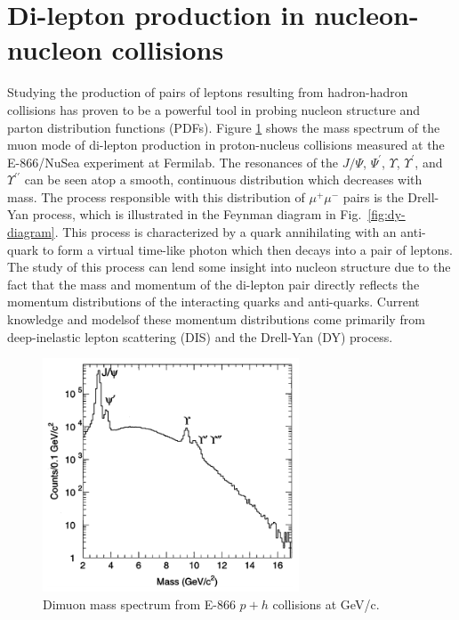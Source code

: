 \section{Di-lepton production in nucleon-nucleon collisions}

Studying the production of pairs of leptons resulting from hadron-hadron collisions has proven to be a powerful tool in probing nucleon structure and parton distribution functions (PDFs). Figure \ref{fig:DY-spectrum} shows the mass spectrum of the muon mode of di-lepton production in proton-nucleus collisions measured at the E-866/NuSea experiment at Fermilab\cite{PhysRevLett.80.3715}. The resonances of the $J/\Psi$, $\Psi^\prime$, $\Upsilon$, $\Upsilon^\prime$, and $\Upsilon^{\prime\prime}$ can be seen atop a smooth, continuous distribution which decreases with mass. The process responsible with this distribution of $\mu^+\mu^-$ pairs is the Drell-Yan process\cite{PhysRevLett.25.316}, which is illustrated in the Feynman diagram in Fig.~\ref{fig:dy-diagram}. This process is characterized by a quark annihilating with an anti-quark to form a virtual time-like photon which then decays into a pair of leptons. The study of this process can lend some insight into nucleon structure due to the fact that the mass and momentum of the di-lepton pair directly reflects the momentum distributions of the interacting quarks and anti-quarks. Current knowledge and models\CN of these momentum distributions come primarily from deep-inelastic lepton scattering (DIS) and the Drell-Yan (DY) process.

\begin{figure}
	\centering
	\includegraphics[width=3in]{figures/background/DY-spectrum-e866.png}
	\caption{Dimuon mass spectrum from E-866 $p+h$ collisions at \unit[800]{GeV/c}\cite{PhysRevLett.80.3715}.}
	\label{fig:DY-spectrum}
\end{figure}

